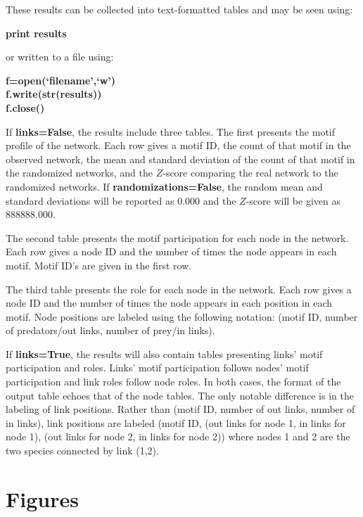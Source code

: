 \documentclass[12pt]{article}
\begin{document}
			These results can be collected into text-formatted tables and may be seen using:

			\textbf{print results}

			or written to a file using:

			\textbf{f=open(`filename',`w')\\
					f.write(str(results))\\
					f.close()}\\
			\medskip


			If \textbf{links=False}, the results include three tables. The first presents the motif profile of the network. Each row gives a motif ID, the count of that motif in the observed network, the mean and standard deviation of the count of that motif in the randomized networks, and the $Z$-score comparing the real network to the randomized networks. If \textbf{randomizations=False}, the random mean and standard deviations will be reported as 0.000 and the $Z$-score will be given as 888888.000.


			The second table presents the motif participation for each node in the network. Each row gives a node ID and the number of times the node appears in each motif. Motif ID's are given in the first row.


			The third table presents the role for each node in the network. Each row gives a node ID and the number of times the node appears in each position in each motif. Node positions are labeled using the following notation: (motif ID, number of predators/out links, number of prey/in links).


			If \textbf{links=True}, the results will also contain tables presenting links' motif participation and roles. Links' motif participation follows nodes' motif participation and link roles follow node roles. In both cases, the format of the output table echoes that of the node tables. The only notable difference is in the labeling of link positions. Rather than (motif ID, number of out links, number of in links), link positions are labeled (motif ID, (out links for node 1, in links for node 1), (out links for node 2, in links for node 2)) where nodes 1 and 2 are the two species connected by link (1,2).

\clearpage

\section{Figures}
\end{document}
